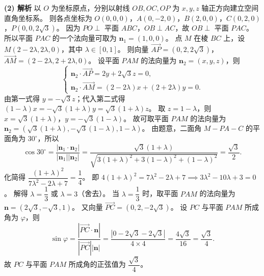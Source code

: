 \begin{answer}
\textbf{(2) 解析} 以 $O$ 为坐标原点，分别以射线 $OB, OC, OP$ 为 $x, y, z$ 轴正方向建立空间直角坐标系。
则各点坐标为 $O(0,0,0)$，$A(0,-2,0)$，$B(2,0,0)$，$C(0,2,0)$，$P(0,0,2\sqrt3)$。
因为 $PO\perp$ 平面 $ABC$，$OB\perp AC$，故 $OB\perp$ 平面 $PAC$。
所以平面 $PAC$ 的一个法向量可取为 $\boldsymbol n_1 = (1, 0, 0)$。
点 $M$ 在棱 $BC$ 上，设 $M(2-2\lambda, 2\lambda, 0)$，其中 $\lambda\in[0,1]$。
则向量 $\vec{AP} = (0, 2, 2\sqrt3)$，$\vec{AM} = (2-2\lambda, 2+2\lambda, 0)$。
设平面 $PAM$ 的法向量为 $\boldsymbol n_2 = (x, y, z)$，则
\nopagebreak[4]
\[\begin{cases} \boldsymbol n_2\cdot\vec{AP} = 2y + 2\sqrt3 z = 0, \\ \boldsymbol n_2\cdot\vec{AM} = (2-2\lambda)x + (2+2\lambda)y = 0. \end{cases}\]
由第一式得 $y = -\sqrt3 z$；代入第二式得 $(1-\lambda)x = -\sqrt3(1+\lambda)y = \sqrt3(1+\lambda)z$。
取 $z = 1-\lambda$，则 $x = \sqrt3(1+\lambda)$，$y = -\sqrt3(1-\lambda)$。
故可取平面 $PAM$ 的法向量为 $\boldsymbol n_2 = (\sqrt3(1+\lambda), -\sqrt3(1-\lambda), 1-\lambda)$。
由题意，二面角 $M-PA-C$ 的平面角为 $30^\circ$，所以
\nopagebreak[4]
\[\cos 30^\circ = \dfrac{|\boldsymbol n_1\cdot\boldsymbol n_2|}{|\boldsymbol n_1||\boldsymbol n_2|} = \dfrac{\sqrt3(1+\lambda)}{\sqrt{3(1+\lambda)^2+3(1-\lambda)^2+(1-\lambda)^2}} = \dfrac{\sqrt3}{2}.\]
化简得 $\dfrac{(1+\lambda)^2}{7\lambda^2-2\lambda+7} = \dfrac14$。
即 $4(1+\lambda)^2 = 7\lambda^2-2\lambda+7 \implies 3\lambda^2-10\lambda+3=0$。
解得 $\lambda = \dfrac13$ 或 $\lambda=3$（舍去）。
当 $\lambda = \dfrac13$ 时，取平面 $PAM$ 的法向量为 $\boldsymbol n = (2\sqrt3, -\sqrt3, 1)$。
又向量 $\vec{PC} = (0, 2, -2\sqrt3)$。
设 $PC$ 与平面 $PAM$ 所成角为 $\varphi$，则
\nopagebreak[4]
\[\sin\varphi = \dfrac{|\vec{PC}\cdot\boldsymbol n|}{|\vec{PC}||\boldsymbol n|} = \dfrac{|0 - 2\sqrt3 - 2\sqrt3|}{4\times 4} = \dfrac{4\sqrt3}{16} = \dfrac{\sqrt3}{4}.\]
故 $PC$ 与平面 $PAM$ 所成角的正弦值为 $\dfrac{\sqrt3}{4}$。



\end{answer}

